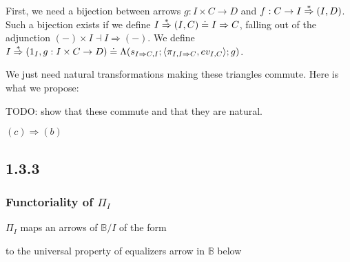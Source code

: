 \documentclass{article}
\begin{document}
First, we need a bijection between arrows $g : I \times C \to D$ and $f : C \to I \overset{\ast}{\Rightarrow} (I,D)$.
Such a bijection exists if we define $I \overset{\ast}{\Rightarrow} (I,C) \doteq I \Rightarrow C$, falling
out of the adjunction $(-) \times I \dashv I \Rightarrow (-)$.
We define $I \overset{\ast}{\Rightarrow} (1_I, g : I \times C \to D) \doteq \Lambda(s_{I \Rightarrow C, I};\langle \pi_{I,I \Rightarrow C}, ev_{I,C}\rangle;g)$.
\begin{center}
\end{center}

We just need natural transformations making these triangles commute. Here is what we propose:

\begin{center}
\end{center}

TODO: show that these commute and that they are natural.

$(c) \Rightarrow (b)$

\subsection*{1.3.3}

\subsubsection*{Functoriality of $\Pi_I$}
 
$\Pi_I$ maps an arrows of $\mathbb B / I$ of the form
\begin{center}
\end{center}
to the universal property of equalizers arrow in $\mathbb B$ below 
\end{document}
